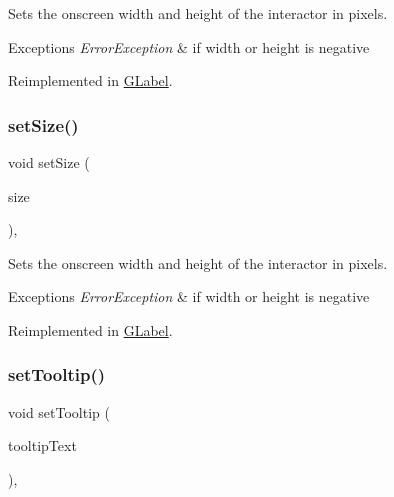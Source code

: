 Sets the onscreen width and height of the interactor in pixels. 


\begin{DoxyExceptions}{Exceptions}
{\em Error\+Exception} & if width or height is negative \\
\hline
\end{DoxyExceptions}


Reimplemented in \mbox{\hyperlink{classsgl_1_1GLabel_a8ba9af72c23f52d4b93096a13a11f150}{G\+Label}}.

\mbox{\label{classsgl_1_1GInteractor_ae2b628228f192c2702c4ce941b2af68f}} 
\subsubsection{\texorpdfstring{set\+Size()}{setSize()}\hspace{0.1cm}{\footnotesize\ttfamily [2/2]}}
{\footnotesize\ttfamily void set\+Size (\begin{DoxyParamCaption}\item[{const \mbox{\hyperlink{structsgl_1_1GDimension}{G\+Dimension}} \&}]{size }\end{DoxyParamCaption})\hspace{0.3cm}{\ttfamily [virtual]}, {\ttfamily [inherited]}}



Sets the onscreen width and height of the interactor in pixels. 


\begin{DoxyExceptions}{Exceptions}
{\em Error\+Exception} & if width or height is negative \\
\hline
\end{DoxyExceptions}


Reimplemented in \mbox{\hyperlink{classsgl_1_1GLabel_a42d96e60c62d7770993327d7147d77b8}{G\+Label}}.

\mbox{\label{classsgl_1_1GInteractor_a039e0e49beaecc275efce02d416acea8}} 
\subsubsection{\texorpdfstring{set\+Tooltip()}{setTooltip()}}
{\footnotesize\ttfamily void set\+Tooltip (\begin{DoxyParamCaption}\item[{const std\+::string \&}]{tooltip\+Text }\end{DoxyParamCaption})\hspace{0.3cm}{\ttfamily [virtual]}, {\ttfamily [inherited]}}



